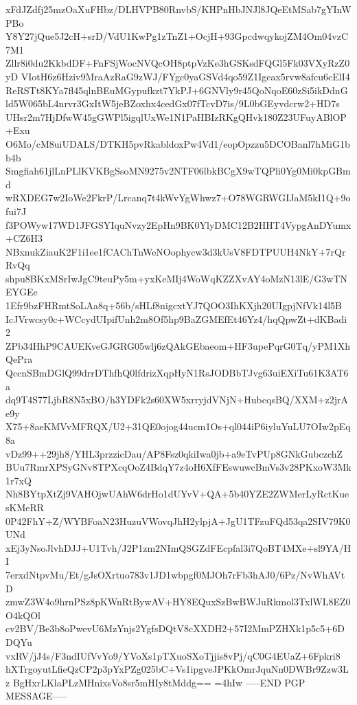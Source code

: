 xFdJZdfj25mzOaXuFHbz/DLHVPB80RnvbS/KHPnHbJNJl8JQeEtMSab7gYInWPBo
Y8Y27jQue5J2cH+srD/VdU1KwPg1zTnZ1+OcjH+93GpcdwqykojZM4Om04vzC7M1
Zllr8i0du2KkbdDF+FnFSjWocNVQcOH8ptpVzKe3hGSKsdFQGl5Fk03VXyRzZ0yD
VIotH6z6Hziv9MraAzRaG9zWJ/FYgc0yaGSVd4qo59Z1Igeax5rvw8afcu6cElI4
ReRSTt8KYa7fl45qlnBEuMGypufkzt7YkPJ+6GNVly9r45QoNqoE60zSi5ikDdnG
ld5W065bL4nrvr3GxItW5jeBZoxhx4cedGx07fTcvD7is/9L0bGEyvdcrw2+HD7s
UHsr2m7HjDfwW45gGWPl5igqlUxWe1N1PaHBIzRKgQHvk180Z23UFuyABlOP+Exu
O6Mo/cM8uiUDALS/DTKH5pvRkabldoxPw4Vd1/eopOpzzu5DCOBanl7hMiG1bb4b
Smgfiah61jlLnPLlKVKBgSsoMN9275v2NTF06lbkBCgX9wTQPli0Yg0Mi0kpGBmd
wRXDEG7w2IoWe2FkrP/Lrcanq7t4kWvYgWhwz7+O78WGRWGIJaM5kI1Q+9ofui7J
f3POWyw17WD1JFGSYIquNvzy2EpHn9BK0YlyDMC12B2HHT4VypgAnDYumx+CZ6H3
NBxnukZiauK2F1i1ee1fCAChTnWeNOophycw3d3kUsV8FDTPUUH4NkY+7rQrRvQq
shpu8BKxMSrIwJgC9teuPy5m+yxKeMIj4WoWqKZZXvAY4oMzN13lE/G3wTNEYGEe
1Efr9bzFHRmtSoLAa8q+56b/sHLf8nigcxtYJ7QOO3IhKXjh20UIgpjNfVk14l5B
IcJVrwcsy0c+WCcydUIpifUnh2m8Of5hp9BaZGMEfEt46Yz4/hqQpwZt+dKBadi2
ZPb34HhP9CAUEKveGJGRG05wlj6zQAkGEbaeom+HF3upePqrG0Tq/yPM1XhQePra
QccnSBmDGlQ99drrDThfhQ0lfdrizXqpHyN1RsJODBbTJvg63uiEXiTu61K3AT6a
dq9T4S77LjbR8N5xBO/h3YDFk2s60XW5xrryjdVNjN+HubcqsBQ/XXM+z2jrAe9y
X75+8aeKMVvMFRQX/U2+31QE0ojog44ucm1Os+ql044iP6iyluYuLU7OIw2pEq8a
vDz99++29jh8/YHL3przzicDau/AP8Fsz0qkiIwa0jb+a9eTvPUp8GNkGubczchZ
BUu7RmrXPSyGNv8TPXcqOoZ4BdqY7z4oH6XfFEswuwcBmVs3v28PKxoW3Mk1r7xQ
Nh8BYtpXtZj9VAHOjwUAhW6drHo1dUYvV+QA+5b40YZE2ZWMerLyRctKuesKMeRR
0P42FhY+Z/WYBFoaN23HuzuVWovqJhH2ylpjA+JgU1TFzuFQd53qa2SIV79K0UNd
xEj3yNsoJlvhDJJ+U1Tvh/J2P1zm2NImQSGZdFEcpfal3i7QoBT4MXe+sl9YA/HI
7erxdNtpvMu/Et/gJsOXrtuo783v1JD1wbpgf0MJOh7rFb3hAJ0/6Pz/NvWhAVtD
zmwZ3W4o9hrnPSz8pKWnRtBywAV+HY8EQuxSzBwBWJuRkmol3TxlWL8EZ0O4kQOl
cv2BV/Be3b8oPwevU6MzYnjs2YgfsDQtV8cXXDH2+57I2MmPZHXk1p5c5+6DDQYu
vxRV/jJ4s/F3ndIUfVvYo9/YVoXs1pTXuoSXoTjjis8vPj/qC0G4EUaZ+6Fpkri8
hXTrgoyutLfieQzCP2p3pYxPZg025bC+Vs1ipgveJPKkOmrJquNn0DWBr9Zzw3Lz
BgHxrLKlaPLzMHnixsVo8sr5mHIy8tMddg==
=4hIw
-----END PGP MESSAGE-----
